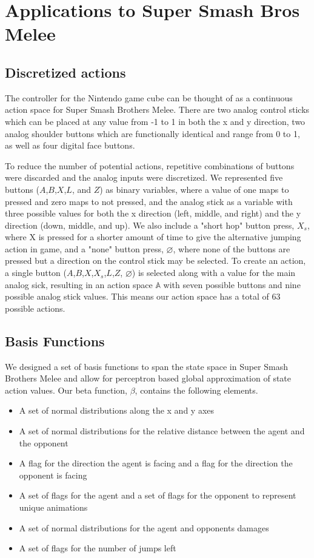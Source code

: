 \section{Applications to Super Smash Bros Melee}

\subsection{Discretized actions}
The controller for the Nintendo game cube can be thought of as a continuous action space for Super Smash Brothers Melee. There are two analog control sticks which can be placed at any value from -1 to 1 in both the x and y direction, two analog shoulder buttons which are functionally identical and range from 0 to 1, as well as four digital face buttons. 

To reduce the number of potential actions, repetitive combinations of buttons were discarded and the analog inputs were discretized. We represented five buttons ($A$,$B$,$X$,$L$, and $Z$) as binary variables, where a value of one maps to pressed and zero maps to not pressed, and the analog stick as a variable with three possible values for both the x direction (left, middle, and right) and the y direction (down, middle, and up). We also include a "short hop" button press, $X_{s}$, where X is pressed for a shorter amount of time to give the alternative jumping action in game, and a "none" button press, $\varnothing$, where none of the buttons are pressed but a direction on the control stick may be selected. To create an action, a single button ($A$,$B$,$X$,$X_{s}$,$L$,$Z$, $\varnothing$) is selected along with a value for the main analog sick, resulting in an action space $\mathbb{A}$ with seven possible buttons and nine possible analog stick values. This means our action space has a total of 63 possible actions. 

\subsection{Basis Functions}
We designed a set of basis functions to span the state space in Super Smash Brothers Melee and allow for perceptron based global approximation of state action values. Our beta function, $\beta$, contains the following elements.

\begin{itemize}
\item A set of normal distributions along the x and y axes
\item A set of normal distributions for the relative distance between the agent and the opponent
\item A flag for the direction the agent is facing and a flag for the direction the opponent is facing
\item A set of flags for the agent and a set of flags for the opponent to represent unique animations
\item A set of normal distributions for the agent and opponents damages
\item A set of flags for the number of jumps left
\end{itemize}

